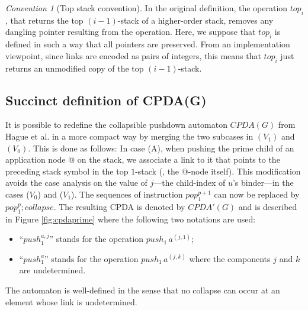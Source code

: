 \documentclass[a4paper,draft]{article}
\theoremstyle{remark}
\newtheorem{convention}{Convention}[section]
\theoremstyle{definition}
\begin{document}
\begin{convention}[Top stack convention]
\label{conv:top_preserve_links}
In the original definition, the operation $top_i$, that returns the top $(i-1)$-stack of a higher-order stack,
 removes any dangling pointer resulting from the operation. Here, we suppose that $top_i$ is defined in such a way that all pointers are preserved. From an implementation viewpoint, since links are encoded as pairs of integers, this means that $top_i$ just returns an unmodified copy of the top $(i-1)$-stack.
\end{convention}

\subsection{Succinct definition of CPDA(G)}
It is possible to redefine the collapsible pushdown automaton $CPDA(G)$ from Hague et al.
\cite{hmos-lics08} in a more compact way by merging the two subcases in
$(V_1)$ and $(V_0)$. This is done as follows: In case (A), when
pushing the prime child of an application node $@$ on the stack, we
associate a link to it that points to the preceding stack symbol in
the top $1$-stack (\ie, the $@$-node itself).
 This modification avoids the case analysis on the value of $j$---the child-index of $u$'s binder---in the
 cases ($V_0$) and ($V_1$). The sequences of instruction $pop_1^{p+1}$ can now be replaced by
 $pop_1^p ; collapse$. The resulting CPDA is denoted by $CPDA'(G)$ and is described in
Figure \ref{fig:cpdaprime} where the following two notations are used:
\begin{itemize}
\item ``$push_1^{a,j}$'' stands for the operation $push_1\,a^{(j,1)}$;
\item ``$push_1^a$'' stands for the operation $push_1\,a^{(j,k)}$ where the components $j$ and $k$ are undetermined.
\end{itemize}
The automaton is well-defined in the sense that no collapse can occur at an element whose link is undetermined.
\end{document}
